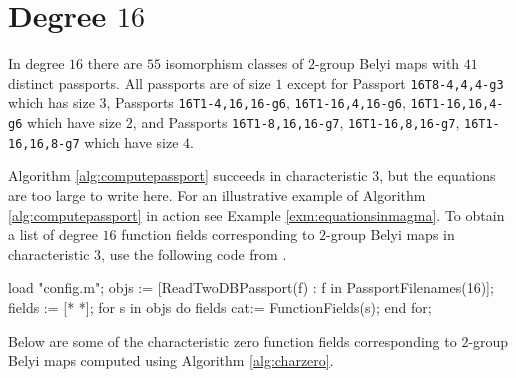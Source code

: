 \documentclass{dcthesis}
\newcommand{\QQ}{\mathbb Q}
\numberwithin{equation}{section}
\theoremstyle{definition}
\theoremstyle{remark}
\begin{document}
{{  \section{Degree $16$}{
    \label{sec:d16}
    In degree $16$ there are $55$
    isomorphism classes of $2$-group Belyi maps
    with $41$ distinct passports.
    All passports are of size $1$
    except for
    Passport
    \texttt{16T8-4,4,4-g3} which has size $3$,
    Passports
    \texttt{16T1-4,16,16-g6},
    \texttt{16T1-16,4,16-g6},
    \texttt{16T1-16,16,4-g6}
    which have size $2$,
    and Passports
    \texttt{16T1-8,16,16-g7},
    \texttt{16T1-16,8,16-g7},
    \texttt{16T1-16,16,8-g7}
    which have size $4$.
    \par
    Algorithm
    \ref{alg:computepassport}
    succeeds in characteristic $3$,
    but the equations are too large to write here.
    For an illustrative example
    of Algorithm
    \ref{alg:computepassport}
    in action
    see Example
    \ref{exm:equationsinmagma}.
    To obtain a list of degree $16$
    function fields corresponding to
    $2$-group Belyi maps
    in characteristic $3$,
    use the following code from
    \cite{twogroupdessins}.
    \begin{magma}
load "config.m";
objs := [ReadTwoDBPassport(f) : f in PassportFilenames(16)];
fields := [* *];
for s in objs do
  fields cat:= FunctionFields(s);
end for;
    \end{magma}
    Below are some of the characteristic zero
    function fields
    corresponding to
    $2$-group Belyi maps
    computed using
    Algorithm
    \ref{alg:charzero}.
}}}
\end{document}
